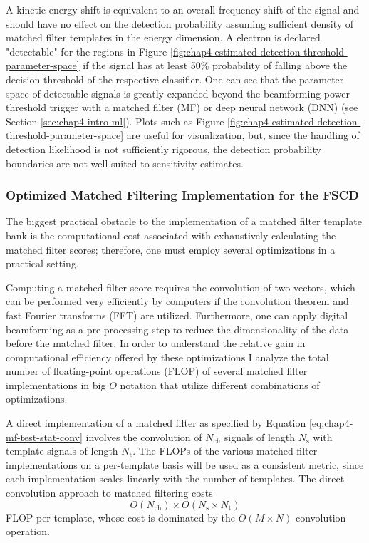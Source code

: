 A kinetic energy shift is equivalent to an overall frequency shift of the signal and should have no effect on the detection probability assuming sufficient density of matched filter templates in the energy dimension. A electron is declared "detectable" for the regions in Figure \ref{fig:chap4-estimated-detection-threshold-parameter-space} if the signal has at least 50\% probability of falling above the decision threshold of the respective classifier. One can see that the parameter space of detectable signals is greatly expanded beyond the beamforming power threshold trigger with a matched filter (MF) or deep neural network (DNN) (see Section \ref{sec:chap4-intro-ml}). Plots such as Figure \ref{fig:chap4-estimated-detection-threshold-parameter-space} are useful for visualization, but, since the handling of detection likelihood is not sufficiently rigorous, the detection probability boundaries are not well-suited to sensitivity estimates.

\subsubsection*{Optimized Matched Filtering Implementation for the FSCD}

The biggest practical obstacle to the implementation of a matched filter template bank is the computational cost associated with exhaustively calculating the matched filter scores; therefore, one must employ several optimizations in a practical setting. 

Computing a matched filter score requires the convolution of two vectors, which can be performed very efficiently by computers if the convolution theorem and fast Fourier transforms (FFT) are utilized. Furthermore, one can apply digital beamforming as a pre-processing step to reduce the dimensionality of the data before the matched filter. In order to understand the relative gain in computational efficiency offered by these optimizations I analyze the total number of floating-point operations (FLOP) of several matched filter implementations in big $O$ notation that utilize different combinations of optimizations. 

A direct implementation of a matched filter as specified by Equation \ref{eq:chap4-mf-test-stat-conv} involves the convolution of $N_\mathrm{ch}$ signals of length $N_\mathrm{s}$ with template signals of length $N_\mathrm{t}$. The FLOPs of the various matched filter implementations on a per-template basis will be used as a consistent metric, since each implementation scales linearly with the number of templates. The direct convolution approach to matched filtering costs
\begin{equation}
    O(N_\mathrm{ch})\times O(N_\mathrm{s}\times N_\mathrm{t})
\end{equation}
FLOP per-template, whose cost is dominated by the $O(M\times N)$ convolution operation. 

